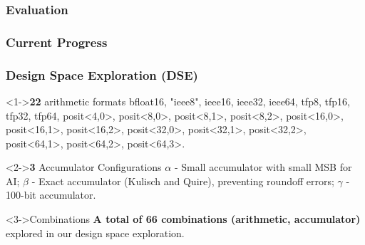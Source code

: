 \subsubsection{Evaluation}
\begin{frame}
    \frametitle{Current Progress}

    \tableofcontents[currentsection,
                     subsectionstyle=show/shaded/hide,
                     sectionstyle=show/hide]

\end{frame}


\begin{frame}
    \frametitle{Design Space Exploration (DSE)}

	\begin{alertblock}<1->{\textbf{22} arithmetic formats}
	bfloat16, "ieee8", ieee16, ieee32, ieee64, tfp8, tfp16, tfp32, tfp64, posit<4,0>, posit<8,0>, posit<8,1>, posit<8,2>, posit<16,0>, posit<16,1>, posit<16,2>, posit<32,0>, posit<32,1>, posit<32,2>, posit<64,1>, posit<64,2>, posit<64,3>.
    \end{alertblock}

	\begin{alertblock}<2->{\textbf{3} Accumulator Configurations}
        $\alpha$ - Small accumulator with small MSB for AI; $\beta$ - Exact accumulator (Kulisch and Quire), preventing roundoff errors; $\gamma$ - 100-bit accumulator.
    \end{alertblock}

    \begin{block}<3->{Combinations}
        \textbf{A total of \textbf{66} combinations (arithmetic, accumulator)} explored in our design space exploration.
    \end{block}
\end{frame}

